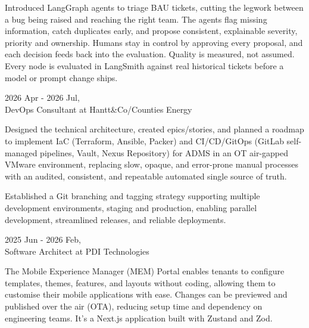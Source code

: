 \begin{resume}
Introduced LangGraph agents to triage BAU tickets, cutting the legwork between a bug being raised and reaching the right team. The agents flag missing information, catch duplicates early, and propose consistent, explainable severity, priority and ownership. Humans stay in control by approving every proposal, and each decision feeds back into the evaluation. Quality is measured, not assumed. Every node is evaluated in LangSmith against real historical tickets before a model or prompt change ships.

\begin{minipage}{\textwidth}
\vspace{0.03in}
\hspace*{-0.25in} 2026 Apr - 2026 Jul,\\
\hspace*{-0.25in} DevOps Consultant at Hantt\&Co/Counties Energy
\vspace{0.165in}

Designed the technical architecture, created epics/stories, and planned a roadmap to implement IaC (Terraform, Ansible, Packer) and CI/CD/GitOps (GitLab self-managed pipelines, Vault, Nexus Repository) for ADMS in an OT air-gapped VMware environment, replacing slow, opaque, and error-prone manual processes with an audited, consistent, and repeatable automated single source of truth.
\end{minipage}

Established a Git branching and tagging strategy supporting multiple development environments, staging and production, enabling parallel development, streamlined releases, and reliable deployments.

\begin{minipage}{\textwidth}
\vspace{0.03in}
\hspace*{-0.25in} 2025 Jun - 2026 Feb,\\
\hspace*{-0.25in} Software Architect at PDI Technologies
\vspace{0.165in}

The Mobile Experience Manager (MEM) Portal enables tenants to configure templates, themes, features, and layouts without coding, allowing them to customise their mobile applications with ease. Changes can be previewed and published over the air (OTA), reducing setup time and dependency on engineering teams. It's a Next.js application built with Zustand and Zod.
\end{minipage}


\end{resume}
